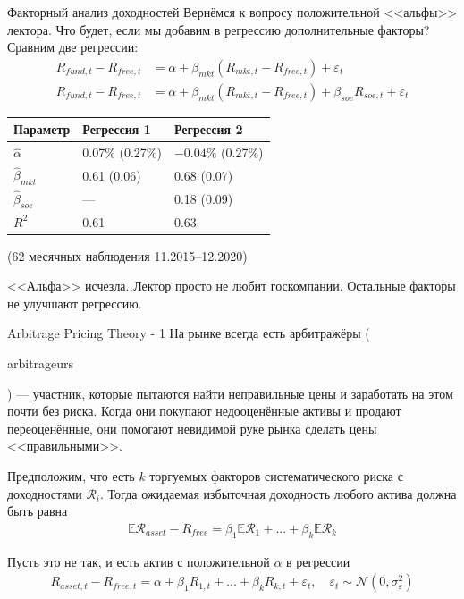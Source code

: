 \documentclass{beamer}
\newcommand{\en}[1]{\begin{otherlanguage}{english}#1\end{otherlanguage}}
\begin{document}
\begin{frame}{Факторный анализ доходностей}
\justify
Вернёмся к вопросу положительной <<альфы>> лектора. Что будет, если мы добавим 
в регрессию дополнительные факторы? Сравним две регрессии:
\begin{align*}
R_{fund,t} - R_{free,t} &=
\alpha + \beta_{mkt}(R_{mkt,t} - R_{free,t}) + \varepsilon_t
\\
R_{fund,t} - R_{free,t} &=
\alpha + \beta_{mkt}(R_{mkt,t} - R_{free,t}) + \beta_{soe}R_{soe,t} + 
\varepsilon_t
\end{align*}

\centering
\begin{tabular}{l|l|l}
Параметр            & Регрессия 1                   & Регрессия 2 \\ \hline
$\hat{\alpha}$      & 0.07\% {\scriptsize (0.27\%)} & $-0.04\%$
{\scriptsize (0.27\%)} \\
$\hat{\beta}_{mkt}$ & 0.61 {\scriptsize (0.06)}     & 0.68
{\scriptsize (0.07)} \\
$\hat{\beta}_{soe}$ & ---                           & 0.18
{\scriptsize (0.09)} \\
$R^2$               & 0.61                          & 0.63 \\ \hline
\end{tabular}

{\scriptsize (62 месячных наблюдения 11.2015--12.2020)}

\justify
<<Альфа>> исчезла. Лектор просто не любит госкомпании. Остальные 
факторы не улучшают регрессию.
\end{frame}



\begin{frame}{Arbitrage Pricing Theory - 1}
\justify
На рынке всегда есть арбитражёры (\en{arbitrageurs}) --- участник, которые 
пытаются найти неправильные цены и заработать на этом почти без риска. Когда
они покупают недооценённые активы и продают переоценённые, они помогают
невидимой руке рынка сделать цены <<правильными>>.

\justify
Предположим, что есть $k$ торгуемых факторов систематического риска с 
доходностями $\mathcal{R}_i$. Тогда ожидаемая избыточная доходность любого 
актива должна быть равна
\begin{align*}
\mathbb{E}\mathcal{R}_{asset} - R_{free} =
\beta_1\mathbb{E}\mathcal{R}_1 + ... + \beta_k\mathbb{E}\mathcal{R}_k
\end{align*}

\justify
Пусть это не так, и есть актив с положительной $\alpha$ в регрессии
\begin{align*}
R_{asset,t} - R_{free,t} =
\alpha + \beta_1R_{1,t} + ... + \beta_kR_{k,t} 
+ \varepsilon_t,\quad
\varepsilon_t \sim \mathcal{N}(0, \sigma_{\varepsilon}^2)
\end{align*}
\end{frame}
\end{document}

